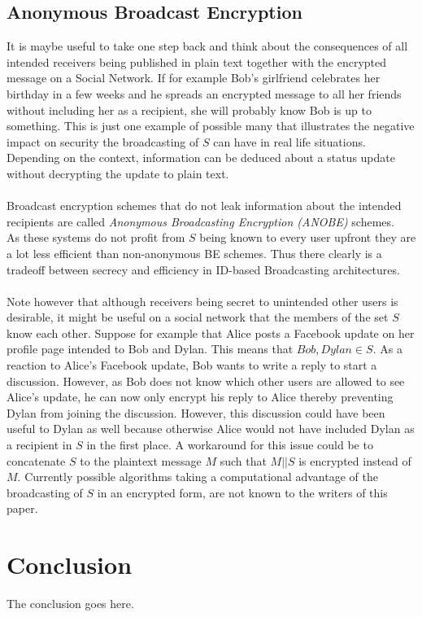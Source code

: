 \documentclass[journal]{IEEEtran}
\begin{document}
\subsection{Anonymous Broadcast Encryption}
It is maybe useful to take one step back and think about the consequences of
all intended receivers being published in plain text together with the encrypted
message on a Social Network. If for example Bob's girlfriend celebrates her
birthday in a few weeks and he spreads an encrypted message to all her friends
without including her as a recipient, she will probably know Bob is up to
something. This is just one example of possible many that illustrates the
negative impact on security the broadcasting of $S$ can have in real life
situations. Depending on the context, information can be deduced about a
status update without decrypting the update to plain text.\\
\\
Broadcast encryption schemes that do not leak information about the intended
recipients are called \textit{Anonymous Broadcasting Encryption (ANOBE)}
schemes.~\cite{LibertANOBE} As these systems do not profit from $S$ being known
to every user upfront they are a lot less efficient than non-anonymous BE
schemes. Thus there clearly is a tradeoff between secrecy and efficiency in
ID-based Broadcasting architectures.\\
\\
Note however that although receivers being secret to unintended other users is
desirable, it might be useful on a social network that the members of the set
$S$ know each other. Suppose for example that Alice posts a Facebook update on
her profile page intended to Bob and Dylan. This means that $Bob, Dylan \in S$.
As a reaction to Alice's Facebook update, Bob wants to write a reply to start a
discussion. However, as Bob does not know which other users are allowed to see
Alice's update, he can now only encrypt his reply to Alice thereby preventing
Dylan from joining the discussion. However, this discussion could have been
useful to Dylan as well because otherwise Alice would not have included Dylan
as a recipient in $S$ in the first place. A workaround for this issue could be
to concatenate $S$ to the plaintext message $M$ such that $M || S$ is encrypted
instead of $M$. Currently possible algorithms taking a computational advantage
of the broadcasting of $S$ in an encrypted form, are not known to the writers
of this paper.

\section{Conclusion}
The conclusion goes here.
\end{document}
